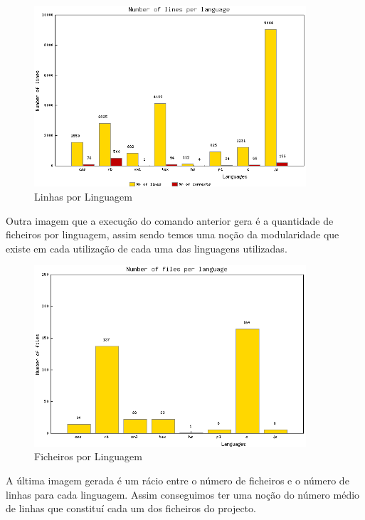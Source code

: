 \begin{figure}[htbp]
\begin{center}
\includegraphics[width=0.9\textwidth]{Images/projecto_LinesPerLanguage.png}
\caption{Linhas por Linguagem}\label{fig:linesperlanguage}
\end{center}
\end{figure}

Outra imagem que a execução do comando anterior gera é a quantidade de ficheiros por linguagem, assim sendo temos uma noção da modularidade que existe
em cada utilização de cada uma das linguagens utilizadas.

\begin{figure}[htbp]
\begin{center}
\includegraphics[width=0.9\textwidth]{Images/projecto_FilesPerLanguage.png}
\caption{Ficheiros por Linguagem}\label{fig:filesperlanguage}
\end{center}
\end{figure}

A última imagem gerada é um rácio entre o número de ficheiros e o número de linhas para cada linguagem. Assim conseguimos ter uma noção do número médio de
linhas que constituí cada um dos ficheiros do projecto.

